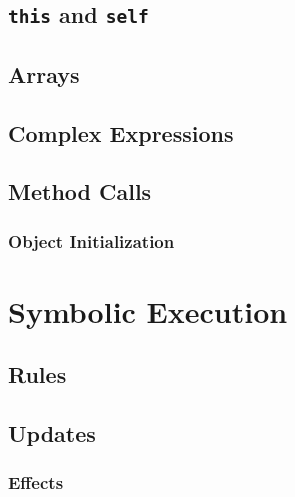 \documentclass[a4paper, 11pt, accentcolor = tud3b]{tudreport}
\begin{document}
            \subsection{\texttt{this} and \texttt{self}} %

            \subsection{Arrays} %

            \subsection{Complex Expressions} %

            \subsection{Method Calls} %

                \subsubsection{Object Initialization} %

        \section{Symbolic Execution} %

            \subsection{Rules} %

            \subsection{Updates} %

                \subsubsection{Effects} %
\end{document}
